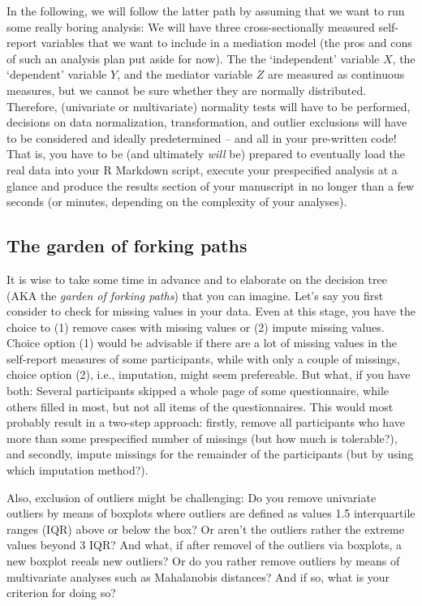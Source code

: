 \documentclass[
]{article}
\begin{document}
In the following, we will follow the latter path by assuming that we
want to run some really boring analysis: We will have three
cross-sectionally measured self-report variables that we want to include
in a mediation model (the pros and cons of such an analysis plan put
aside for now). The the `independent' variable \(X\), the `dependent'
variable \(Y\), and the mediator variable \(Z\) are measured as
continuous measures, but we cannot be sure whether they are normally
distributed. Therefore, (univariate or multivariate) normality tests
will have to be performed, decisions on data normalization,
transformation, and outlier exclusions will have to be considered and
ideally predetermined -- and all in your pre-written code! That is, you
have to be (and ultimately \emph{will} be) prepared to eventually load
the real data into your R Markdown script, execute your prespecified
analysis at a glance and produce the results section of your manuscript
in no longer than a few seconds (or minutes, depending on the complexity
of your analyses).

\hypertarget{the-garden-of-forking-paths}{%
\subsection{The garden of forking
paths}\label{the-garden-of-forking-paths}}

It is wise to take some time in advance and to elaborate on the decision
tree (AKA the \emph{garden of forking paths}) that you can imagine.
Let's say you first consider to check for missing values in your data.
Even at this stage, you have the choice to (1) remove cases with missing
values or (2) impute missing values. Choice option (1) would be
advisable if there are a lot of missing values in the self-report
measures of some participants, while with only a couple of missings,
choice option (2), i.e., imputation, might seem prefereable. But what,
if you have both: Several participants skipped a whole page of some
questionnaire, while others filled in most, but not all items of the
questionnaires. This would most probably result in a two-step approach:
firstly, remove all participants who have more than some prespecified
number of missings (but how much is tolerable?), and secondly, impute
missings for the remainder of the participants (but by using which
imputation method?).

Also, exclusion of outliers might be challenging: Do you remove
univariate outliers by means of boxplots where outliers are defined as
values 1.5 interquartile ranges (IQR) above or below the box? Or aren't
the outliers rather the extreme values beyond 3 IQR? And what, if after
removel of the outliers via boxplots, a new boxplot reeals new outliers?
Or do you rather remove outliers by means of multivariate analyses such
as Mahalanobis distances? And if so, what is your criterion for doing
so?
\end{document}
